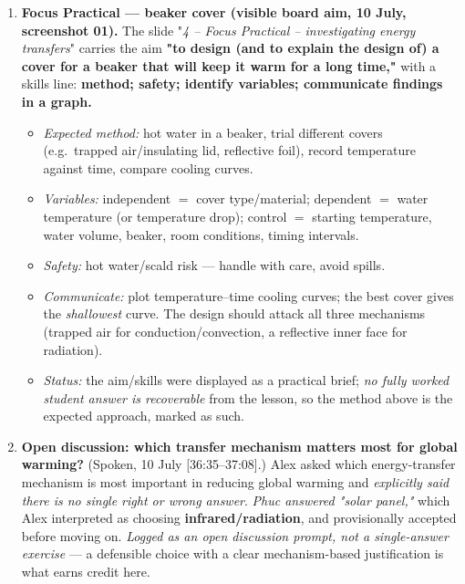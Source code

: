 \documentclass[11pt,a4paper]{article}
\newcommand{\ts}[1]{\textup{[#1]}}       %
\begin{document}
\begin{enumerate}[leftmargin=1.6em,itemsep=5pt,label=\textbf{F\arabic*.}]
\item \textbf{Focus Practical --- beaker cover (visible board aim, 10 July, screenshot 01).}
  The slide "\textit{4 -- Focus Practical -- investigating energy transfers}" carries the aim
  \textbf{"to design (and to explain the design of) a cover for a beaker that will keep it
  warm for a long time,"} with a skills line: \textbf{method; safety; identify variables;
  communicate findings in a graph.}
  \begin{itemize}[leftmargin=1.4em,itemsep=1pt]
    \item \emph{Expected method:} hot water in a beaker, trial different covers (e.g.\ trapped
          air/insulating lid, reflective foil), record temperature against time, compare
          cooling curves.
    \item \emph{Variables:} independent $=$ cover type/material; dependent $=$ water
          temperature (or temperature drop); control $=$ starting temperature, water volume,
          beaker, room conditions, timing intervals.
    \item \emph{Safety:} hot water/scald risk --- handle with care, avoid spills.
    \item \emph{Communicate:} plot temperature--time cooling curves; the best cover gives the
          \emph{shallowest} curve. The design should attack all three mechanisms (trapped air
          for conduction/convection, a reflective inner face for radiation).
    \item \emph{Status:} the aim/skills were displayed as a practical brief; \emph{no fully
          worked student answer is recoverable} from the lesson, so the method above is the
          expected approach, marked as such.
  \end{itemize}

\item \textbf{Open discussion: which transfer mechanism matters most for global warming?}
  (Spoken, 10 July \ts{36:35--37:08}.) Alex asked which energy-transfer mechanism is most
  important in reducing global warming and \emph{explicitly said there is no single right or
  wrong answer}. \emph{Phuc answered "solar panel,"} which Alex interpreted as choosing
  \textbf{infrared/radiation}, and provisionally accepted before moving on. \emph{Logged as
  an open discussion prompt, not a single-answer exercise} --- a defensible choice with a
  clear mechanism-based justification is what earns credit here.
\end{enumerate}

\clearpage
\end{document}
